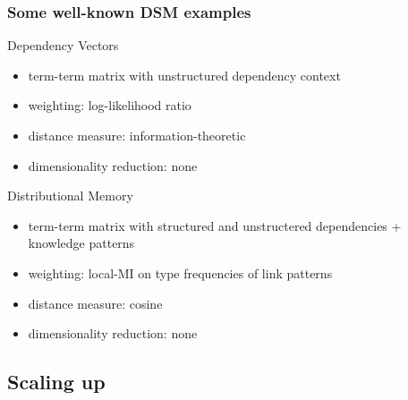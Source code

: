 \documentclass[t]{beamer} %
\begin{document}
\begin{frame}
  \frametitle{Some well-known DSM examples}

  \ungap
  \begin{block}{Dependency Vectors \citep{Pado:Lapata:07}}
  \begin{itemize}
  \item term-term matrix with unstructured dependency context
  \item weighting: log-likelihood ratio
  \item distance measure: information-theoretic \citep{Lin:98a}
  \item dimensionality reduction: none
  \end{itemize}
  \end{block}
 
 \begin{block} {Distributional Memory \citep{Baroni:Lenci:10}}
  \begin{itemize}
  \item term-term matrix with structured and unstructered dependencies + knowledge patterns
  \item weighting: local-MI on type frequencies of link patterns
  \item distance measure: cosine
  \item dimensionality reduction: none
  \end{itemize}
  \end{block}
 \end{frame}

\subsection{Scaling up}
\end{document}
